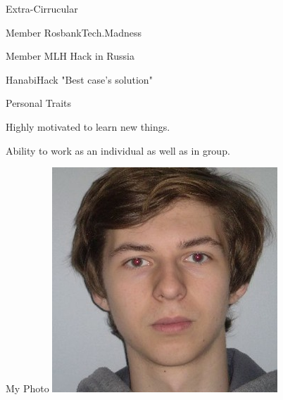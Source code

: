 \documentclass{resume} %
\begin{document}
\begin{rSection}{Extra-Cirrucular} \itemsep -3pt
\item Member RosbankTech.Madness
\item Member MLH Hack in Russia
\item HanabiHack "Best case's solution"

\end{rSection}
\begin{rSection}{Personal Traits}
\item Highly motivated to learn new things.
\item Ability to work as an individual as well as in group.
\end{rSection}
\begin{rSection}{My Photo}
\includegraphics[scale = 0.5]{ya1.jpg}
\end{rSection}
\end{document}
